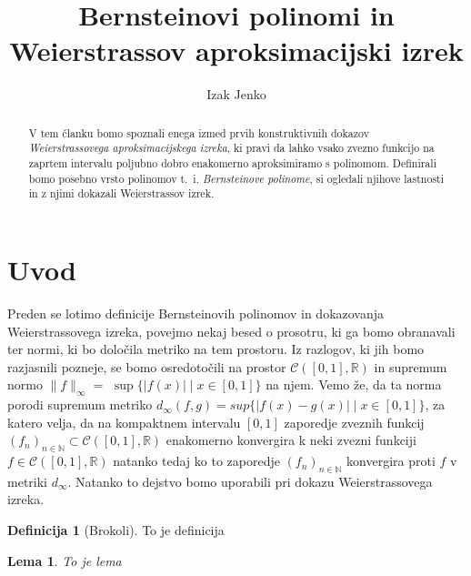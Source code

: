 \documentclass[a4paper]{amsart}
\theoremstyle{theorem}
\newtheorem{lema}[izrek]{Lema}
\theoremstyle{definition}
\newtheorem{definicija}{Definicija}[section]
\begin{document}
\title{Bernsteinovi polinomi in Weierstrassov aproksimacijski izrek}
\author{Izak Jenko}

\maketitle
\thispagestyle{empty}

\begin{abstract}
	V tem članku bomo spoznali enega izmed prvih konstruktivnih dokazov 
	\emph{Weierstrassovega aproksimacijskega izreka}, ki pravi da lahko vsako zvezno 
	funkcijo na zaprtem intervalu poljubno dobro enakomerno aproksimiramo s polinomom. 
	Definirali bomo posebno vrsto polinomov t.~i. \emph{Bernsteinove polinome}, si ogledali
	njihove lastnosti in z njimi dokazali Weierstrassov izrek.
\end{abstract}

\newcommand{\RR}{\mathbb{R}}
\newcommand{\NN}{\mathbb{N}}
\newcommand{\CIR}{\mathcal{C}([0,1],\RR)}

\section{Uvod}

Preden se lotimo definicije Bernsteinovih polinomov in dokazovanja Weierstrassovega
izreka, povejmo nekaj besed o prosotru, ki ga bomo obranavali ter normi, ki bo
določila metriko na tem prostoru. Iz razlogov, ki jih bomo razjasnili pozneje, se bomo
osredotočili na prostor $\mathcal{C}([0,1],\mathbb{R})$ in supremum normo
$\|f\|_{\infty} =$ $\sup \{|f(x)|\mid x \in [0,1]\}$ na njem. Vemo že, da ta norma porodi 
supremum metriko $d_{\infty}(f, g) = sup \{|f(x) - g(x)| \mid x \in [0,1]\}$, 
za katero velja, da na kompaktnem intervalu $[0,1]$ zaporedje zveznih funkcij 
$(f_n)_{n \in \NN} \subset \CIR$ enakomerno konvergira k neki zvezni funkciji $f \in \CIR$
natanko tedaj ko to zaporedje $(f_n)_{n \in \NN}$ konvergira proti $f$ v metriki $d_\infty$.
Natanko to dejstvo bomo uporabili pri dokazu Weierstrassovega izreka.








\newpage

\begin{definicija}[Brokoli]
	To je definicija
\end{definicija}

\begin{lema}
	To je lema
\end{lema}
\end{document}
